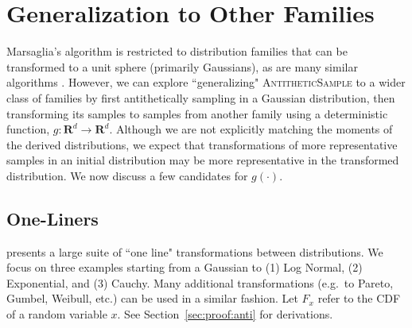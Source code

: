 


\section{Generalization to Other Families}
\label{sec:generalization}


Marsaglia's algorithm is restricted to distribution families that can be transformed to a unit sphere (primarily Gaussians), as are many similar algorithms \cite{cheng1984generation, pullin1979generation}. However, we can explore ``generalizing" \textsc{AntitheticSample} to a wider class of families by first antithetically sampling in a Gaussian distribution, then transforming its samples to samples from another family using a deterministic function, $g: \mathbf{R}^d \rightarrow \mathbf{R}^d$. Although we are not explicitly matching the moments of the derived distributions, we expect that transformations of more representative samples in an initial distribution may be more representative in the  transformed distribution. We now discuss a few candidates for $g(\cdot)$.

\subsection{One-Liners}
\cite{devroye1996random} presents a large suite of ``one line" transformations between distributions. We focus on three examples starting from a Gaussian to (1) Log Normal, (2) Exponential, and (3) Cauchy. Many additional transformations (e.g.~to Pareto, Gumbel, Weibull, etc.) can be used in a similar fashion. Let $F_x$ refer to the CDF of a random variable $x$. See Section~\ref{sec:proof:anti} for derivations.

